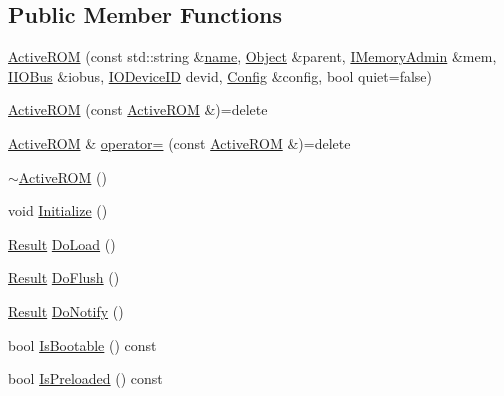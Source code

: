 \subsection*{Public Member Functions}
\begin{DoxyCompactItemize}
\item 
\hyperlink{class_simulator_1_1_active_r_o_m_a2137ead94a167055ef56bd6db9786468}{Active\+R\+O\+M} (const std\+::string \&\hyperlink{mtconf_8c_a8f8f80d37794cde9472343e4487ba3eb}{name}, \hyperlink{class_simulator_1_1_object}{Object} \&parent, \hyperlink{class_simulator_1_1_i_memory_admin}{I\+Memory\+Admin} \&mem, \hyperlink{class_simulator_1_1_i_i_o_bus}{I\+I\+O\+Bus} \&iobus, \hyperlink{namespace_simulator_a3493d987c866ad6b8aaa704c42502db0}{I\+O\+Device\+I\+D} devid, \hyperlink{class_config}{Config} \&config, bool quiet=false)
\item 
\hyperlink{class_simulator_1_1_active_r_o_m_a0f85814d38ccc6b8e16540b4d9de68d0}{Active\+R\+O\+M} (const \hyperlink{class_simulator_1_1_active_r_o_m}{Active\+R\+O\+M} \&)=delete
\item 
\hyperlink{class_simulator_1_1_active_r_o_m}{Active\+R\+O\+M} \& \hyperlink{class_simulator_1_1_active_r_o_m_a90174654122be07ef6c493adfdcdff80}{operator=} (const \hyperlink{class_simulator_1_1_active_r_o_m}{Active\+R\+O\+M} \&)=delete
\item 
\hyperlink{class_simulator_1_1_active_r_o_m_ab4f08efaf6e5c2192f768164be6f2b4f}{$\sim$\+Active\+R\+O\+M} ()
\item 
void \hyperlink{class_simulator_1_1_active_r_o_m_afc31072ac817e301dc15e0b05ab1ef2d}{Initialize} ()
\item 
\hyperlink{namespace_simulator_a4b6b5616e7236c0c131516a441776805}{Result} \hyperlink{class_simulator_1_1_active_r_o_m_a8ea9481d45793f62bddfdb932a876b1d}{Do\+Load} ()
\item 
\hyperlink{namespace_simulator_a4b6b5616e7236c0c131516a441776805}{Result} \hyperlink{class_simulator_1_1_active_r_o_m_ab2a9e8a3e9a657938f0212c862713caa}{Do\+Flush} ()
\item 
\hyperlink{namespace_simulator_a4b6b5616e7236c0c131516a441776805}{Result} \hyperlink{class_simulator_1_1_active_r_o_m_acd043e41debf4bcf2ff2af4b9ececd88}{Do\+Notify} ()
\item 
bool \hyperlink{class_simulator_1_1_active_r_o_m_a6620b1ba031bd5de70872109825f842a}{Is\+Bootable} () const 
\item 
bool \hyperlink{class_simulator_1_1_active_r_o_m_a009279dd2e81893784c396716b0e8dea}{Is\+Preloaded} () const 

\end{DoxyCompactItemize}
